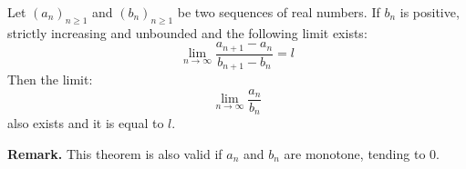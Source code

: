 \documentclass[12pt]{article}
\begin{document}
Let $(a_n)_{n \geq 1}$ and $(b_n)_{n \geq 1}$ be two sequences of real numbers. If $b_n$ is positive, strictly increasing and unbounded and the following limit exists:
$$ \lim_{n \rightarrow \infty} \frac{a_{n+1}-a_n}{b_{n+1}-b_n}=l$$
Then the limit:
$$\lim_{n \rightarrow \infty} \frac{a_n}{b_n}$$ also exists and it is equal to $l$.

\textbf{Remark.}  This theorem is also valid if $a_n$ and $b_n$ are monotone, tending to $0$.
\end{document}
